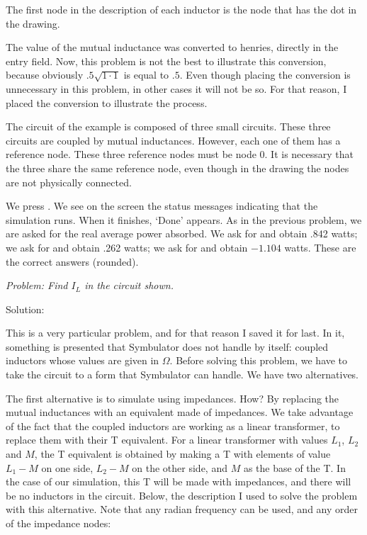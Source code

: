 The first node in the description of each inductor is the node that
has the dot in the drawing.

The value of the mutual inductance was converted to henries,
directly in the entry field. Now, this problem is not the best to
illustrate this conversion, because obviously $.5\sqrt{1 \cdot 1}$
is equal to $.5$. Even though placing the conversion is unnecessary
in this problem, in other cases it will not be so. For that reason,
I placed the conversion to illustrate the process.

The circuit of the example is composed of three small circuits.
These three circuits are coupled by mutual inductances. However,
each one of them has a reference node. These three reference nodes
must be node 0. It is necessary that the three share the same
reference node, even though in the drawing the nodes are not
physically connected.

We press . We see on the screen the status messages
indicating that the simulation runs. When it finishes, `Done'
appears. As in the previous problem, we are asked for the real
average power absorbed. We ask for  and obtain
.842 watts; we ask for  and obtain .262 watts; we
ask for  and obtain $-1.104$ watts. These are the
correct answers (rounded).


\emph{Problem: Find $I_L$ in the circuit shown.}

Solution:

This is a very particular problem, and for that reason I saved it
for last. In it, something is presented that Symbulator does not
handle by itself: coupled inductors whose values are given in
$\Omega$. Before solving this problem, we have to take the circuit
to a form that Symbulator can handle. We have two alternatives.

The first alternative is to simulate using impedances. How? By
replacing the mutual inductances with an equivalent made of
impedances. We take advantage of the fact that the coupled inductors
are working as a linear transformer, to replace them with their T
equivalent. For a linear transformer with values $L_1$, $L_2$ and
$M$, the T equivalent is obtained by making a T with elements of
value $L_1 - M$ on one side, $L_2 - M$ on the other side, and $M$ as
the base of the T. In the case of our simulation, this T will be
made with impedances, and there will be no inductors in the circuit.
Below, the description I used to solve the problem with this
alternative. Note that any radian frequency can be used, and any
order of the impedance nodes:

